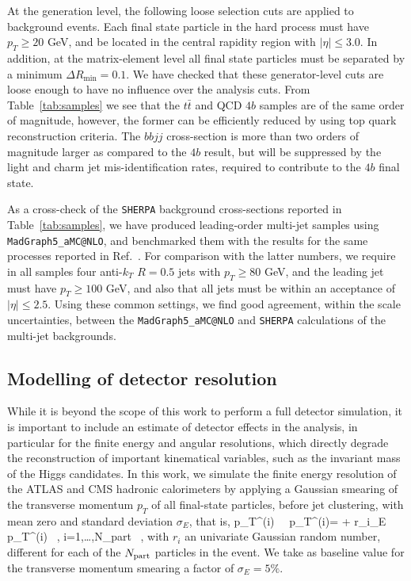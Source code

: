 At the generation level, the following loose selection 
cuts are applied to
background events.
%
Each final state particle in the hard process must have $p_T \ge 20$ GeV, and be located
in the central  rapidity
region with
$| \eta | \le 3.0$.
%
In addition, at the matrix-element level
all final state particles must be separated by a minimum $\Delta R_{\mathrm{min}} =0.1$.
%
We have checked that these generator-level cuts are loose enough to have
no influence over the analysis cuts.
%
From Table~\ref{tab:samples}
we see that the $t\bar{t}$ and QCD $4b$ samples are of
the same order of magnitude, however, the former can be efficiently
reduced by using top quark reconstruction criteria.
%
The $bbjj$ cross-section is more than two orders
of magnitude larger as compared to the
$4b$ result, but will be suppressed
by the light and charm jet mis-identification rates,
required to contribute to the $4b$ final state.

 
 


As a cross-check of the {\tt SHERPA}
background cross-sections reported in Table~\ref{tab:samples}, we have produced leading-order
multi-jet samples
using {\tt MadGraph5\_aMC@NLO}, and
benchmarked them with the results for the same processes reported in
Ref.~\cite{Alwall:2014hca}.
%
For comparison with the latter numbers, 
we require in all samples four anti-$k_T$ $R=0.5$ jets with $p_T \ge 80 $ GeV, and the leading jet must have $p_T \ge 100$ GeV, and
also that all jets must be within an acceptance of $|\eta| \le 2.5 $.
%
Using these common settings,
we find good agreement,
within the scale uncertainties, between the
{\tt MadGraph5\_aMC@NLO} and {\tt SHERPA} calculations of the multi-jet
backgrounds.


\subsection{Modelling of detector resolution}
\label{sec:detectormodeling}

While it is beyond the scope of this work to perform a full
detector simulation, it is important to include an estimate of detector
effects in the analysis, in particular for the finite energy
and angular resolutions, which directly
degrade the reconstruction of important kinematical variables, such as
the invariant mass of the Higgs candidates.
%
In this work, we simulate the finite energy resolution of the ATLAS and CMS
hadronic calorimeters by applying a Gaussian smearing of the transverse
momentum $p_T$ of all
final-state particles, before jet clustering,
with mean zero and standard deviation $\sigma_E$, that is,
%
\be
\label{eq:smearing}
p_T^{(i)} \, \to \, p_T^{(i)\prime}= + r_i\cdot\sigma_E \rp\, p_T^{(i)} \, , \quad
i=1,\ldots,N_{\rm part} \, ,
\ee
with $r_i$ an univariate Gaussian random number, different for each
of the $N_{\rm part}$ particles in the event.
%
We take as baseline value for the transverse momentum smearing a
factor of $\sigma_E=5\%$.
%

